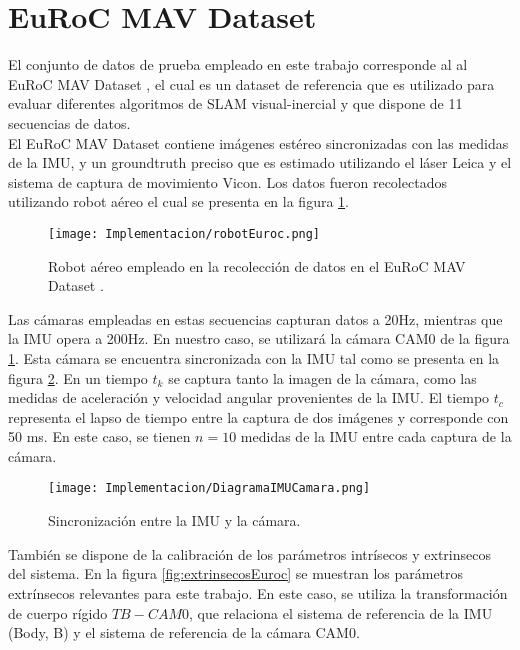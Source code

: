 \section{EuRoC MAV Dataset}
El conjunto de datos de prueba empleado en este trabajo corresponde al al EuRoC MAV Dataset \cite{0}, el cual es un dataset de referencia que es utilizado para evaluar diferentes algoritmos de SLAM visual-inercial y que dispone de 11 secuencias de datos. \\


El EuRoC MAV Dataset contiene imágenes estéreo sincronizadas con las medidas de la IMU,  y un groundtruth preciso que es estimado utilizando el láser Leica y el sistema de captura de movimiento Vicon. Los datos fueron recolectados utilizando robot aéreo el cual se presenta en la figura \ref{fig:robotEuroc}. \\

\begin{figure}[H]
	\centering
	\texttt{[image: Implementacion/robotEuroc.png]}
	\caption{Robot aéreo empleado en la recolección de datos en el EuRoC MAV Dataset .}
	\label{fig:robotEuroc}
\end{figure}

Las cámaras empleadas en estas secuencias capturan datos a 20Hz, mientras que la IMU opera a 200Hz. En nuestro caso, se utilizará la cámara CAM0 de la figura \ref{fig:robotEuroc}. Esta cámara se encuentra sincronizada con la IMU tal como se presenta en la figura \ref{fig:sincronizacionEuroc}. En un tiempo $t_k$ se captura tanto la imagen de la cámara, como las medidas de aceleración y velocidad angular provenientes de la IMU. El tiempo $t_c$ representa el lapso de tiempo entre la captura de dos imágenes y corresponde con 50 ms. En este caso, se tienen $n = 10$ medidas de la IMU entre cada captura de la cámara. \\

\begin{figure}[H]
	\centering
	\texttt{[image: Implementacion/DiagramaIMUCamara.png]}
	\caption{Sincronización entre la IMU y la cámara.}
	\label{fig:sincronizacionEuroc}
\end{figure}

También se dispone de la calibración de los parámetros intrísecos y extrinsecos del sistema. En la figura \ref{fig:extrinsecosEuroc} se muestran los parámetros extrínsecos relevantes para este trabajo. En este caso, se utiliza la transformación de cuerpo rígido $T{B-CAM0}$, que relaciona el sistema de referencia de la IMU (Body, B) y el sistema de referencia de la cámara CAM0. 



